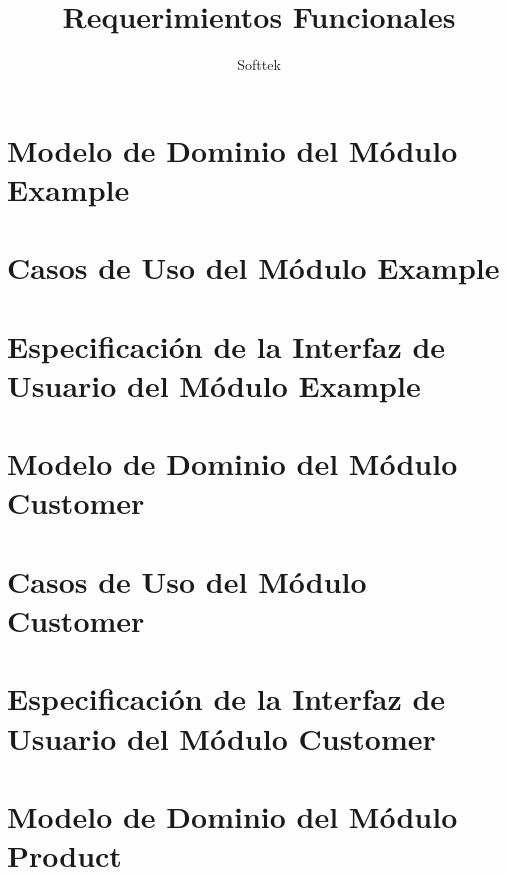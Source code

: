 \documentclass[10pt, letterpaper]{report}
\begin{document}
\title{Requerimientos Funcionales}
\author{Softtek}
\date{}




\pagestyle{plain}
\tableofcontents

\pagestyle{fancy}
\fancyhf{}
\fancyhead[OC]{\leftmark}
\fancyhead[EC]{\rightmark}
\cfoot{\thepage}
\chapter{Modelo de Dominio del M\'odulo Example}
\clearpage


\chapter{Casos de Uso del M\'odulo Example}


\chapter{Especificaci\'on de la Interfaz de Usuario del M\'odulo Example}

\chapter{Modelo de Dominio del M\'odulo Customer}
\clearpage


\chapter{Casos de Uso del M\'odulo Customer}


\chapter{Especificaci\'on de la Interfaz de Usuario del M\'odulo Customer}

\chapter{Modelo de Dominio del M\'odulo Product}
\clearpage

\end{document}
